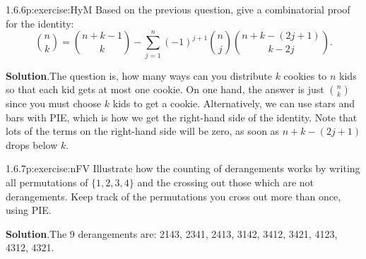 \documentclass[twoside,11pt,]{book}
\newcommand{\blocktitlefont}{\relax}
\numberwithin{equation}{chapter}
\begin{document}
\begin{divisionsolution}{1.6.6}{}{p:exercise:HyM}%
Based on the previous question, give a combinatorial proof for the identity:%
\begin{equation*}
{n \choose k} = {n+k-1 \choose k} - \sum_{j=1}^n (-1)^{j+1}{n \choose j}{n+k-(2j+1) \choose k - 2j}\text{.}
\end{equation*}
%
\par\smallskip%
\noindent\textbf{\blocktitlefont Solution}.\quad{}The question is, how many ways can you distribute \(k\) cookies to \(n\) kids so that each kid gets at most one cookie. On one hand, the answer is just \({n \choose k}\) since you must choose \(k\) kids to get a cookie. Alternatively, we can use stars and bars with PIE, which is how we get the right-hand side of the identity. Note that lots of the terms on the right-hand side will be zero, as soon as \(n+k-(2j+1)\) drops below \(k\).%
\end{divisionsolution}%
\begin{divisionsolution}{1.6.7}{}{p:exercise:nFV}%
Illustrate how the counting of derangements works by writing all permutations of \(\{1,2,3,4\}\) and the crossing out those which are not derangements. Keep track of the permutations you cross out more than once, using PIE.%
\par\smallskip%
\noindent\textbf{\blocktitlefont Solution}.\quad{}The 9 derangements are: 2143, 2341, 2413, 3142, 3412, 3421, 4123, 4312, 4321.%
\end{divisionsolution}%
\end{document}
